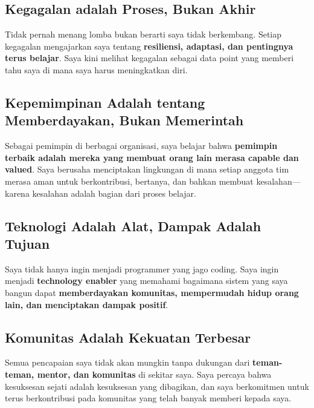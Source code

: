 \documentclass[
  letterpaper,
  DIV=11,
  numbers=noendperiod]{scrreprt}
\begin{document}
\subsection{\texorpdfstring{\textbf{Kegagalan adalah Proses, Bukan
Akhir}}{Kegagalan adalah Proses, Bukan Akhir}}\label{kegagalan-adalah-proses-bukan-akhir}

Tidak pernah menang lomba bukan berarti saya tidak berkembang. Setiap
kegagalan mengajarkan saya tentang \textbf{resiliensi, adaptasi, dan
pentingnya terus belajar}. Saya kini melihat kegagalan sebagai data
point yang memberi tahu saya di mana saya harus meningkatkan diri.

\subsection{\texorpdfstring{\textbf{Kepemimpinan Adalah tentang
Memberdayakan, Bukan
Memerintah}}{Kepemimpinan Adalah tentang Memberdayakan, Bukan Memerintah}}\label{kepemimpinan-adalah-tentang-memberdayakan-bukan-memerintah}

Sebagai pemimpin di berbagai organisasi, saya belajar bahwa
\textbf{pemimpin terbaik adalah mereka yang membuat orang lain merasa
capable dan valued}. Saya berusaha menciptakan lingkungan di mana setiap
anggota tim merasa aman untuk berkontribusi, bertanya, dan bahkan
membuat kesalahan---karena kesalahan adalah bagian dari proses belajar.

\subsection{\texorpdfstring{\textbf{Teknologi Adalah Alat, Dampak Adalah
Tujuan}}{Teknologi Adalah Alat, Dampak Adalah Tujuan}}\label{teknologi-adalah-alat-dampak-adalah-tujuan}

Saya tidak hanya ingin menjadi programmer yang jago coding. Saya ingin
menjadi \textbf{technology enabler} yang memahami bagaimana sistem yang
saya bangun dapat \textbf{memberdayakan komunitas, mempermudah hidup
orang lain, dan menciptakan dampak positif}.

\subsection{\texorpdfstring{\textbf{Komunitas Adalah Kekuatan
Terbesar}}{Komunitas Adalah Kekuatan Terbesar}}\label{komunitas-adalah-kekuatan-terbesar}

Semua pencapaian saya tidak akan mungkin tanpa dukungan dari
\textbf{teman-teman, mentor, dan komunitas} di sekitar saya. Saya
percaya bahwa kesuksesan sejati adalah kesuksesan yang dibagikan, dan
saya berkomitmen untuk terus berkontribusi pada komunitas yang telah
banyak memberi kepada saya.
\end{document}
